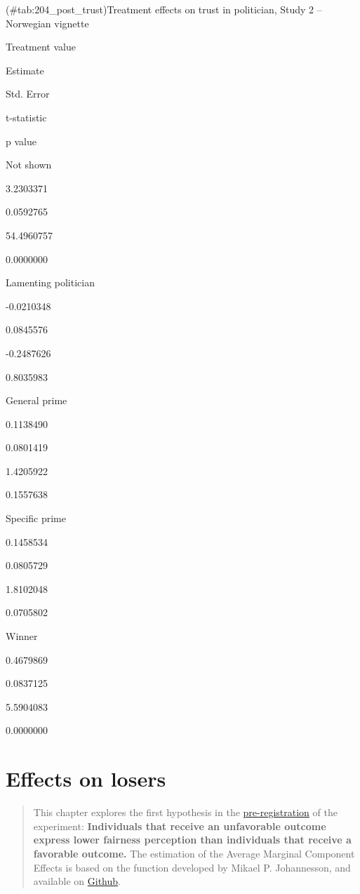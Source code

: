 \documentclass[]{book}
\begin{document}
(\#tab:204\_post\_trust)Treatment effects on trust in politician, Study
2 -- Norwegian vignette

Treatment value

Estimate

Std. Error

t-statistic

p value

Not shown

3.2303371

0.0592765

54.4960757

0.0000000

Lamenting politician

-0.0210348

0.0845576

-0.2487626

0.8035983

General prime

0.1138490

0.0801419

1.4205922

0.1557638

Specific prime

0.1458534

0.0805729

1.8102048

0.0705802

Winner

0.4679869

0.0837125

5.5904083

0.0000000

\chapter{Effects on losers}\label{effects-on-losers-1}

\begin{quote}
This chapter explores the first hypothesis in the
\href{GoogLoser_Prereg_3_\#16823\%5B16065\%5D.pdf}{pre-registration} of
the experiment: \textbf{Individuals that receive an unfavorable outcome
express lower fairness perception than individuals that receive a
favorable outcome.} The estimation of the Average Marginal Component
Effects is based on the function developed by Mikael P. Johannesson, and
available on
\href{https://rdrr.io/github/mikajoh/descr2/man/amce.html}{Github}.
\end{quote}
\end{document}
